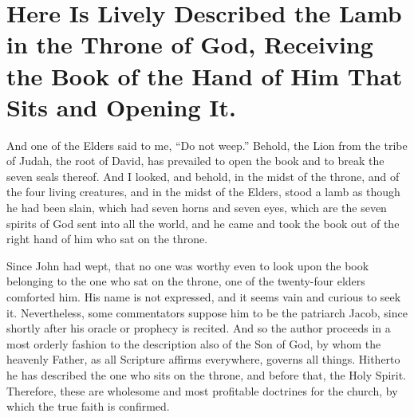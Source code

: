 \chapter[Sermon 27. Here Is Lively Described the Lamb in the Throne of God, Receiving the Book of the Hand of Him That Sits and Opening It.]{Here Is Lively Described the Lamb in the Throne of God, Receiving the Book of the Hand of Him That Sits and Opening It.}
\label{sermon:027}

And one of the Elders said to me, “Do not weep.” Behold, the Lion from the tribe of Judah, the root of David, has prevailed to open the book and to break the seven seals thereof. And I looked, and behold, in the midst of the throne, and of the four living creatures, and in the midst of the Elders, stood a lamb as though he had been slain, which had seven horns and seven eyes, which are the seven spirits of God sent into all the world, and he came and took the book out of the right hand of him who sat on the throne.

Since John had wept, that no one was worthy even to look upon the book belonging to the one who sat on the throne, one of the twenty-four elders comforted him. His name is not expressed, and it seems vain and curious to seek it. Nevertheless, some commentators suppose him to be the patriarch Jacob, since shortly after his oracle or prophecy is recited. And so the author proceeds in a most orderly fashion to the description also of the Son of God, by whom the heavenly Father, as all Scripture affirms everywhere, governs all things. Hitherto he has described the one who sits on the throne, and before that, the Holy Spirit. Therefore, these are wholesome and most profitable doctrines for the church, by which the true faith is confirmed.

